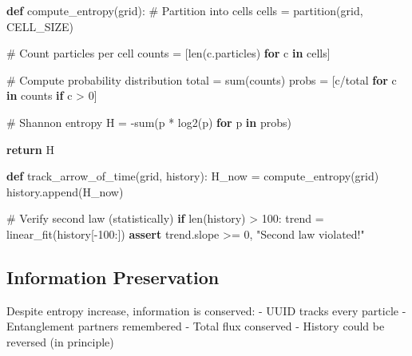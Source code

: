 \documentclass[
  11pt,
  letterpaper,
  twoside,
  openright]{book}
\newenvironment{Shaded}{\begin{snugshade}}{\end{snugshade}}
\newcommand{\BuiltInTok}[1]{\textcolor[rgb]{0.00,0.23,0.31}{#1}}
\newcommand{\CommentTok}[1]{\textcolor[rgb]{0.37,0.37,0.37}{#1}}
\newcommand{\ControlFlowTok}[1]{\textcolor[rgb]{0.00,0.23,0.31}{\textbf{#1}}}
\newcommand{\DecValTok}[1]{\textcolor[rgb]{0.68,0.00,0.00}{#1}}
\newcommand{\KeywordTok}[1]{\textcolor[rgb]{0.00,0.23,0.31}{\textbf{#1}}}
\newcommand{\NormalTok}[1]{\textcolor[rgb]{0.00,0.23,0.31}{#1}}
\newcommand{\OperatorTok}[1]{\textcolor[rgb]{0.37,0.37,0.37}{#1}}
\newcommand{\StringTok}[1]{\textcolor[rgb]{0.13,0.47,0.30}{#1}}
\begin{document}
\begin{Shaded}
\begin{Highlighting}[]
\KeywordTok{def}\NormalTok{ compute\_entropy(grid):}
    \CommentTok{\# Partition into cells}
\NormalTok{    cells }\OperatorTok{=}\NormalTok{ partition(grid, CELL\_SIZE)}

    \CommentTok{\# Count particles per cell}
\NormalTok{    counts }\OperatorTok{=}\NormalTok{ [}\BuiltInTok{len}\NormalTok{(c.particles) }\ControlFlowTok{for}\NormalTok{ c }\KeywordTok{in}\NormalTok{ cells]}

    \CommentTok{\# Compute probability distribution}
\NormalTok{    total }\OperatorTok{=} \BuiltInTok{sum}\NormalTok{(counts)}
\NormalTok{    probs }\OperatorTok{=}\NormalTok{ [c}\OperatorTok{/}\NormalTok{total }\ControlFlowTok{for}\NormalTok{ c }\KeywordTok{in}\NormalTok{ counts }\ControlFlowTok{if}\NormalTok{ c }\OperatorTok{\textgreater{}} \DecValTok{0}\NormalTok{]}

    \CommentTok{\# Shannon entropy}
\NormalTok{    H }\OperatorTok{=} \OperatorTok{{-}}\BuiltInTok{sum}\NormalTok{(p }\OperatorTok{*}\NormalTok{ log2(p) }\ControlFlowTok{for}\NormalTok{ p }\KeywordTok{in}\NormalTok{ probs)}

    \ControlFlowTok{return}\NormalTok{ H}

\KeywordTok{def}\NormalTok{ track\_arrow\_of\_time(grid, history):}
\NormalTok{    H\_now }\OperatorTok{=}\NormalTok{ compute\_entropy(grid)}
\NormalTok{    history.append(H\_now)}

    \CommentTok{\# Verify second law (statistically)}
    \ControlFlowTok{if} \BuiltInTok{len}\NormalTok{(history) }\OperatorTok{\textgreater{}} \DecValTok{100}\NormalTok{:}
\NormalTok{        trend }\OperatorTok{=}\NormalTok{ linear\_fit(history[}\OperatorTok{{-}}\DecValTok{100}\NormalTok{:])}
        \ControlFlowTok{assert}\NormalTok{ trend.slope }\OperatorTok{\textgreater{}=} \DecValTok{0}\NormalTok{, }\StringTok{"Second law violated!"}
\end{Highlighting}
\end{Shaded}

\subsection{Information Preservation}\label{information-preservation}

Despite entropy increase, information is conserved: - UUID tracks every
particle - Entanglement partners remembered - Total flux conserved -
History could be reversed (in principle)
\end{document}
